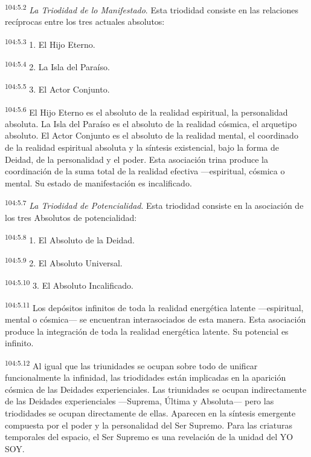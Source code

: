 \documentclass[twoside, 11pt]{book}
\begin{document}
\par
\textsuperscript{104:5.2} \textit{La Triodidad de lo Manifestado}. Esta triodidad consiste en las relaciones recíprocas entre los tres actuales absolutos:

\par
\textsuperscript{104:5.3} 1. El Hijo Eterno.

\par
\textsuperscript{104:5.4} 2. La Isla del Paraíso.

\par
\textsuperscript{104:5.5} 3. El Actor Conjunto.

\par
\textsuperscript{104:5.6} El Hijo Eterno es el absoluto de la realidad espiritual, la personalidad absoluta. La Isla del Paraíso es el absoluto de la realidad cósmica, el arquetipo absoluto. El Actor Conjunto es el absoluto de la realidad mental, el coordinado de la realidad espiritual absoluta y la síntesis existencial, bajo la forma de Deidad, de la personalidad y el poder. Esta asociación trina produce la coordinación de la suma total de la realidad efectiva ---espiritual, cósmica o mental. Su estado de manifestación es incalificado.

\par
\textsuperscript{104:5.7} \textit{La Triodidad de Potencialidad}. Esta triodidad consiste en la asociación de los tres Absolutos de potencialidad:

\par
\textsuperscript{104:5.8} 1. El Absoluto de la Deidad.

\par
\textsuperscript{104:5.9} 2. El Absoluto Universal.

\par
\textsuperscript{104:5.10} 3. El Absoluto Incalificado.

\par
\textsuperscript{104:5.11} Los depósitos infinitos de toda la realidad energética latente ---espiritual, mental o cósmica--- se encuentran interasociados de esta manera. Esta asociación produce la integración de toda la realidad energética latente. Su potencial es infinito.

\par
\textsuperscript{104:5.12} Al igual que las triunidades se ocupan sobre todo de unificar funcionalmente la infinidad, las triodidades están implicadas en la aparición cósmica de las Deidades experienciales. Las triunidades se ocupan indirectamente de las Deidades experienciales ---Suprema, Última y Absoluta--- pero las triodidades se ocupan directamente de ellas. Aparecen en la síntesis emergente compuesta por el poder y la personalidad del Ser Supremo. Para las criaturas temporales del espacio, el Ser Supremo es una revelación de la unidad del YO SOY.
\end{document}
